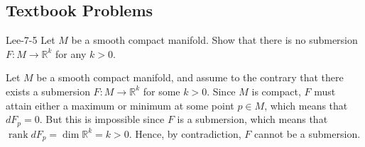 \documentclass{article}
\begin{document}
\subsection{Textbook Problems}
\begin{prb}{Lee-7-5}
	Let $M$ be a smooth compact manifold. Show that there is no submersion $F: M \to \mathbb{R}^{k}$ for any $k > 0$. 
\end{prb}
\begin{solutions}
	Let $M$ be a smooth compact manifold, and assume to the contrary that there exists a submersion $F: M \to \mathbb{R}^{k}$ for some $k > 0$. Since $M$ is compact, $F$ must attain either a maximum or minimum at some point $p \in M$, which means that $dF_{p} = 0$. But this is impossible since $F$ is a submersion, which means that $\operatorname{rank}{dF_{p}} = \operatorname{dim}{\mathbb{R}^{k}} = k > 0$. Hence, by contradiction, $F$ cannot be a submersion. 
\end{solutions}
\end{document}
